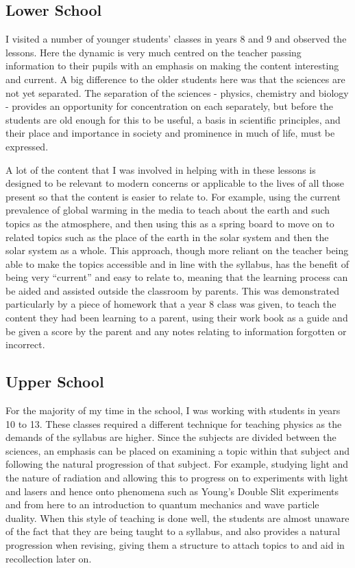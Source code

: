 	\subsection{Lower School} %
	\label{sub:lower_school}
		I visited a number of younger students' classes in years 8 and 9 and observed the lessons. Here the dynamic is very much centred on the teacher passing information to their pupils with an emphasis on making the content interesting and current. A big difference to the older students here was that the sciences are not yet separated. The separation of the sciences - physics, chemistry and biology - provides an opportunity for concentration on each separately, but before the students are old enough for this to be useful, a basis in scientific principles, and their place and importance in society and prominence in much of life, must be expressed.

		A lot of the content that I was involved in helping with in these lessons is designed to be relevant to modern concerns or applicable to the lives of all those present so that the content is easier to relate to. For example, using the current prevalence of global warming in the media to teach about the earth and such topics as the atmosphere, and then using this as a spring board to move on to related topics such as the place of the earth in the solar system and then the solar system as a whole. This approach, though more reliant on the teacher being able to make the topics accessible and in line with the syllabus, has the benefit of being very ``current'' and easy to relate to, meaning that the learning process can be aided and assisted outside the classroom by parents. This was demonstrated particularly by a piece of homework that a year 8 class was given, to teach the content they had been learning to a parent, using their work book as a guide and be given a score by the parent and any notes relating to information forgotten or incorrect.


	\subsection{Upper School} %
	\label{sub:upper_school}
		For the majority of my time in the school, I was working with students in years 10 to 13. These classes required a different technique for teaching physics as the demands of the syllabus are higher. Since the subjects are divided between the sciences, an emphasis can be placed on examining a topic within that subject and following the natural progression of that subject. For example, studying light and the nature of radiation and allowing this to progress on to experiments with light and lasers and hence onto phenomena such as Young's Double Slit experiments and from here to an introduction to quantum mechanics and wave particle duality. When this style of teaching is done well, the students are almost unaware of the fact that they are being taught to a syllabus, and also provides a natural progression when revising, giving them a structure to attach topics to and aid in recollection later on.

